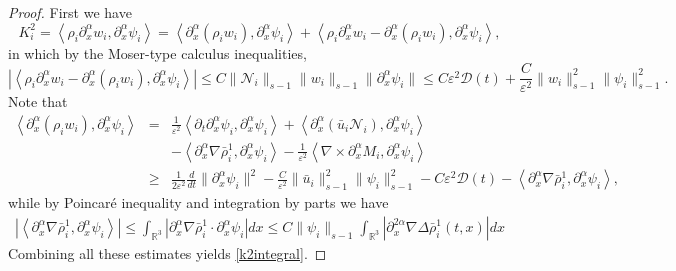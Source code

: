 \documentclass[reqno,twoside,12pt,a4paper]{amsart}
\newcommand{\eps}{\mathbb{\varepsilon}}
\newcommand{\al}{\alpha}
\newcommand{\pa}{\partial}
\newcommand{\D}{\nabla}
\newcommand{\Ni}{\mathcal{N}_i}
\numberwithin{equation}{section}
\begin{document}
\begin{proof}
First we have
\begin{equation*}
    K_i^2=\left\langle \rho_i \partial^\al_x w_i, \partial^\al_x \psi_i\right\rangle = \left\langle \partial^\al_x (\rho_i w_i), \partial^\al_x \psi_i\right\rangle +\left\langle \rho_i \partial^\al_x w_i - \partial^\al_x (\rho_i w_i), \partial^\al_x \psi_i\right\rangle,
\end{equation*}
in which by the Moser-type calculus inequalities, 
\[
|\left\langle \rho_i \partial^\al_x w_i - \partial^\al_x (\rho_i w_i), \partial^\al_x \psi_i\right\rangle|\leq C\|\Ni\|_{s-1}\|w_i\|_{s-1}\|\pa_x^\al \psi_i\|\leq C\eps^2 \mathcal{D}(t)+\frac{C}{\eps^2}\|w_i\|^2_{s-1}\|\psi_i\|_{s-1}^2.
\]
Note that
\begin{eqnarray*}
        \left\langle \partial^\al_x (\rho_i w_i), \partial^\al_x \psi_i\right\rangle &= & \frac{1}{\eps^2} \left\langle \partial_t \partial^\al_x \psi_i, \partial^\al_x \psi_i \right\rangle + \left\langle \partial^\al_x (\bar{u}_i \Ni), \partial^\al_x \psi_i \right\rangle\nonumber\\
        && - \left\langle \partial^\al_x \nabla \bar{\rho}_i^1, \partial^\al_x \psi_i \right\rangle - \frac{1}{\eps^2} \left\langle \nabla \times \partial^\al_x M_i, \partial^\al_x \psi_i \right\rangle\nonumber\\
        &\geq& \frac{1}{2\eps^2} \frac{d}{dt} \|\partial^\al_x \psi_i\|^2-\frac{C}{\eps^2}\|\bar{u}_i\|^2_{s-1}\|\psi_i\|^2_{s-1}-C\eps^2\mathcal{D}(t) -  \left\langle \partial^\al_x \nabla \bar{\rho}_i^1, \partial^\al_x \psi_i \right\rangle,
\end{eqnarray*}
while by Poincar\'e inequality and integration by parts we have
\begin{eqnarray*}
     |\left\langle  \partial^\al_x \nabla \bar{\rho}_i^1, \partial^\al_x \psi_i \right\rangle| \leq \int_{\mathbb{R}^3} |\pa_x^\al \nabla \bar{\rho}_i^1 \cdot \pa_x^\al \psi_i | dx \leq C\|\psi_i\|_{s-1} \int_{\mathbb{R}^3} |\pa_x^{2\al} \D \Delta \bar{\rho}^1_i (t,x)| dx 
\end{eqnarray*}
Combining all these estimates yields \eqref{k2integral}.
\end{proof}
\end{document}
